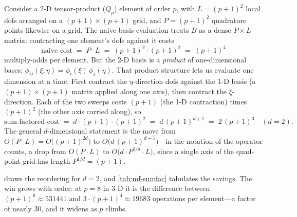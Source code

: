 Consider a 2-D tensor-product ($Q_p$) element of order $p$, with
$L=(p+1)^2$ local dofs arranged on a $(p+1)\times(p+1)$ grid, and $P=(p+1)^2$
quadrature points likewise on a grid. The naive basis evaluation treats $B$ as a
dense $P\times L$ matrix: contracting one element's dofs against it costs
\[
  \text{naive cost} \;=\; P\cdot L \;=\; (p+1)^2\cdot(p+1)^2 \;=\; (p+1)^4
\]
multiply-adds per element. But the 2-D basis is a \emph{product} of
one-dimensional bases: $\phi_{ij}(\xi,\eta)=\phi_i(\xi)\,\phi_j(\eta)$. That
product structure lets us evaluate one dimension at a time. First contract the
$\eta$-direction dofs against the 1-D basis (a $(p+1)\times(p+1)$ matrix applied
along one axis), then contract the $\xi$-direction. Each of the two
sweeps costs $(p+1)$ (the 1-D contraction) times $(p+1)^2$ (the other axis carried
along), so
\[
  \text{sum-factored cost} \;=\; d\cdot(p+1)\cdot(p+1)^2 \;=\; d\,(p+1)^{d+1}
  \;=\; 2\,(p+1)^3 \quad (d=2).
\]
The general $d$-dimensional statement is the move from $O(P\cdot L)=O\!\big((p+1)^{2d}\big)$
to $O\!\big(d\,(p+1)^{d+1}\big)$---in the notation of the operator counts, a drop
from $O(P\cdot L)$ to $O\!\big(d\cdot P^{1/d}\cdot L\big)$, since a single axis of
the quad-point grid has length $P^{1/d}=(p+1)$.

 draws the reordering for $d=2$, and \cref{tab:mf-sumfac}
tabulates the savings. The win grows with order: at $p=8$ in 3-D it is the
difference between $(p+1)^6\approx\num{531441}$ and
$3\cdot(p+1)^4\approx\num{19683}$ operations per element---a factor of nearly
$30$, and it widens as $p$ climbs.

